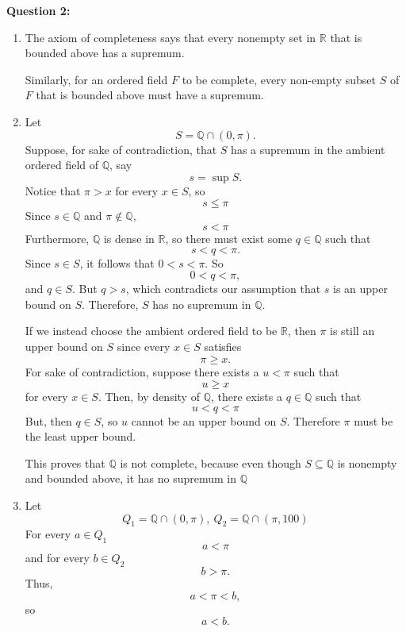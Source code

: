 \documentclass[12pt]{article}
\begin{document}
\noindent{} \textbf{Question 2:}
\begin{enumerate}
      \item [(a)] The axiom of completeness says that every nonempty set in $\mathbb{R}$ that is bounded above has a supremum.

            Similarly, for an ordered field $F$ to be complete, every non-empty subset $S$ of $F$ that is bounded above must have a supremum.
      \item [(b)]
            Let
            \[
                  S = \mathbb{Q} \cap (0, \pi).
            \]
            Suppose, for sake of contradiction, that $S$ has a supremum in the ambient ordered field of $\mathbb{Q}$, say
            \[ s = \sup S. \]
            Notice that $\pi > x$ for every $x \in S$, so
            \[
                  s \leq \pi
            \]
            Since $s \in \mathbb{Q}$ and $\pi \notin \mathbb{Q}$,
            \[
                  s < \pi
            \]
            Furthermore, $\mathbb{Q}$ is dense in $\mathbb{R}$, so there must exist some $q \in \mathbb{Q}$ such that
            \[
                  s < q < \pi.
            \]
            Since $s \in S$, it follows that $0 < s < \pi$. So
            \[
                  0 < q < \pi,
            \]
            and $q \in S$.
            But $q > s$, which contradicts our assumption that $s$ is an upper bound on $S$.
            Therefore, $S$ has no supremum in $\mathbb{Q}$.

            If we instead choose the ambient ordered field to be $\mathbb{R}$,
            then $\pi$ is still an upper bound on $S$ since every $x \in S$ satisfies
            \[
                  \pi \geq x.
            \]
            For sake of contradiction, suppose there exists a $u < \pi$ such that
            \[
                  u \geq x
            \]
            for every $x \in S$.
            Then, by density of $\mathbb{Q}$, there exists a $q \in \mathbb{Q}$ such that
            \[
                  u < q < \pi
            \]
            But, then $q \in S$, so $u$ cannot be an upper bound on $S$.
            Therefore $\pi$ must be the least upper bound.

            This proves that $\mathbb{Q}$ is not complete,
            because even though $S \subseteq \mathbb{Q}$ is nonempty and bounded above,
            it has no supremum in $\mathbb{Q}$
      \item [(c)]
            Let
            \[ Q_1 = \mathbb{Q} \cap (0, \pi),~ Q_2 = \mathbb{Q} \cap (\pi, 100)\]
            For every $a \in Q_1$
            \[
                  a < \pi
            \]
            and for every $b \in Q_2$
            \[
                  b > \pi.
            \]
            Thus,
            \[
                  a < \pi < b,
            \]
            so
            \[
                  a < b.
            \]


\end{enumerate}
\end{document}
